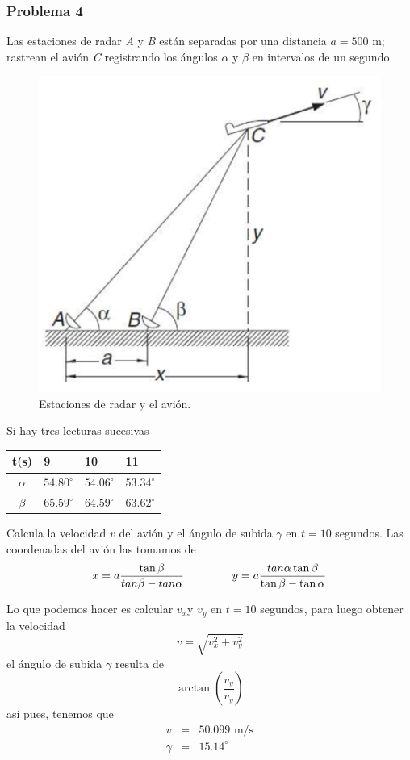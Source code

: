 \begin{frame}
\frametitle{Problema 4}
Las estaciones de radar \textit{A} y \textit{B} están separadas por una distancia $a=500$ m; rastrean el avión \textit{C} registrando los ángulos $\alpha$ y $\beta$ en intervalos de un segundo. 
\begin{figure}[H]
	\centering
	\includegraphics[scale=0.4]{Imagenes/ExamenFinal02_01.eps} 
	\caption{Estaciones de radar y el avión.}
\end{figure}
\end{frame}
\begin{frame}
Si hay tres lecturas sucesivas
\begin{center}
\begin{tabular}{c l l l }
t(s) & 9 & 10 & 11 \\ \hline
$\alpha$ & $54.80^{\circ}$ & $54.06^{\circ}$ & $53.34^{\circ}$ \\ \hline
$\beta$ & $65.59^{\circ}$ & $64.59^{\circ}$ & $63.62^{\circ}$
\end{tabular}
\end{center}
Calcula la velocidad $v$ del avión y el ángulo de subida $\gamma$ en $t=10$ segundos. Las coordenadas del avión las tomamos de
\[x = a \dfrac{\tan \beta}{tan \beta - tan \alpha} \hspace{1.5cm} y= a\dfrac{tan \alpha \tan \beta}{\tan \beta - \tan \alpha}\]
\end{frame}
\begin{frame}
Lo que podemos hacer es calcular $v_{x}$y $v_{y}$ en $t=10$ segundos, para luego obtener la velocidad
\[ v = \sqrt{v_{x}^{2} + v_{y}^{2}}\]
el ángulo de subida $\gamma$ resulta de
\[ \arctan \left( \dfrac{v_{y}}{v_{y}} \right)\]
así pues, tenemos que
\begin{eqnarray*}
v &=& 50.099 \mbox{ m/s} \\
\gamma &=& 15.14^{\circ}
\end{eqnarray*}
\end{frame}
